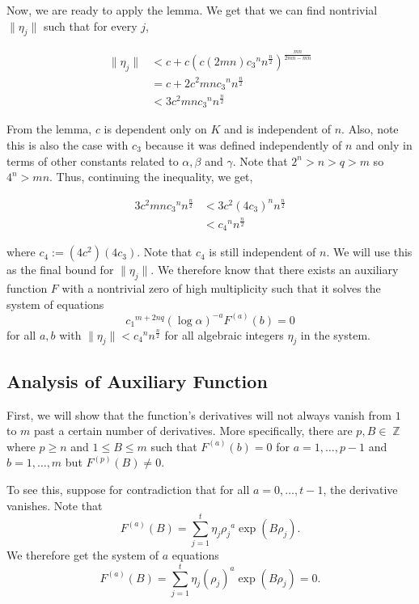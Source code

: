\documentclass[a4paper, 11pt]{book}
\DeclareMathOperator{\Z}{\mathbb{Z}}
\begin{document}
{Now, we are ready to apply the lemma. We get that we can find nontrivial $\| \eta_j \|$ such that for every $j$, 

\begin{align*}
    \| \eta_j \| &< c + c{\left(c\left(2mn\right){c_3}^{n}n^{\frac{n}{2}}\right)}^{\frac{mn}{2mn - mn}} \\
                 &= c + 2c^{2}mn{c_{3}}^{n}n^{\frac{n}{2}} \\
                 &< 3{c}^{2}mn{c_{3}}^{n}{n}^{\frac{n}{2}} 
\end{align*}
}

From the lemma, $c$ is dependent only on $K$ and is independent of $n$. Also, note this is also the case with $c_3$ because it was defined independently of $n$ and only in terms of other constants related to $\alpha, \beta$ and $\gamma$. Note that $2^{n} > n > q > m$ so $4^{n} > mn$. Thus, continuing the inequality, we get,

\begin{align*}
    3{c}^{2}mn{c_{3}}^{n}{n}^{\frac{n}{2}} &< 3{c}^{2}{(4c_3)}^{n}n^{\frac{n}{2}} \\ 
                                           &< {c_4}^{n}n^{\frac{n}{2}}
\end{align*}

where $c_4 := \left(4{c}^{2}\right)\left(4c_3\right)$. Note  that $c_4$ is still independent of $n$. We will use this as the final bound for $\| \eta_j \|$. We therefore know that there exists an auxiliary function $F$ with a nontrivial zero of high multiplicity such that it solves the system of equations 
\[{c_1}^{m + 2nq} {(\log \alpha)}^{-a}F^{(a)}(b) = 0\]
for all $a,b$ with $\| \eta_j \| < {c_4}^{n}n^{\frac{n}{2}}$ for all algebraic integers $\eta_j$ in the system.

\subsection{Analysis of Auxiliary Function}
First, we will show that the function's derivatives will not always vanish from $1$ to $m$ past a certain number of derivatives. More specifically, there are $p, B \in \Z$ where $p \geq n$ and $1 \leq B \leq m$ such that $F^{(a)}(b) = 0$ for $a = 1, \ldots, p-1$ and $b = 1, \ldots, m$ but $F^{(p)}(B) \neq 0$.\par

To see this, suppose for contradiction that for all $a = 0, \ldots, t-1$, the derivative vanishes. Note that \[F^{(a)}(B) = \sum\limits_{j=1}^{t} \eta_{j}{\rho_{j}}^{a}\exp(B\rho_j).\] We therefore get the system of $a$ equations \[F^{(a)}(B) = \sum\limits_{j = 1}^{t} \eta_{j}{\left(\rho_j\right)}^{a}\exp(B\rho_j) = 0.\]
\end{document}
